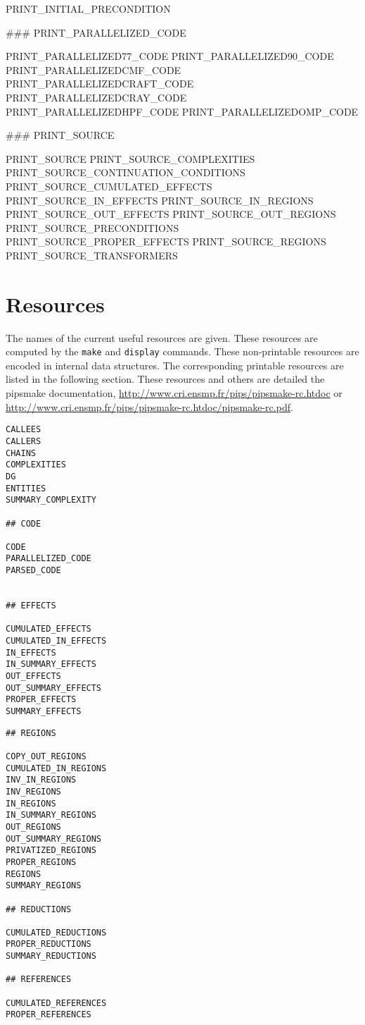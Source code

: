 \documentclass[a4paper,12pt]{article}
\newcommand{\PipsPIPSmakePDF}{\url{http://www.cri.ensmp.fr/pips/pipsmake-rc.htdoc/pipsmake-rc.pdf}\xspace}
\newcommand{\PipsPIPSmakeHTDOC}{\url{http://www.cri.ensmp.fr/pips/pipsmake-rc.htdoc}\xspace}
\begin{document}
\begin{verbatim*}
PRINT_INITIAL_PRECONDITION

### PRINT_PARALLELIZED_CODE

PRINT_PARALLELIZED77_CODE
PRINT_PARALLELIZED90_CODE
PRINT_PARALLELIZEDCMF_CODE
PRINT_PARALLELIZEDCRAFT_CODE
PRINT_PARALLELIZEDCRAY_CODE
PRINT_PARALLELIZEDHPF_CODE
PRINT_PARALLELIZEDOMP_CODE

### PRINT_SOURCE

PRINT_SOURCE
PRINT_SOURCE_COMPLEXITIES
PRINT_SOURCE_CONTINUATION_CONDITIONS
PRINT_SOURCE_CUMULATED_EFFECTS
PRINT_SOURCE_IN_EFFECTS
PRINT_SOURCE_IN_REGIONS
PRINT_SOURCE_OUT_EFFECTS
PRINT_SOURCE_OUT_REGIONS
PRINT_SOURCE_PRECONDITIONS
PRINT_SOURCE_PROPER_EFFECTS
PRINT_SOURCE_REGIONS
PRINT_SOURCE_TRANSFORMERS
\end{verbatim*}


\section{Resources}
\label{res}

The names of the current useful resources are given. These resources are
computed by the \verb+make+ and \verb+display+ commands. These
non-printable resources are encoded in internal data structures. The
corresponding printable resources are listed in the following section.
These resources and others are detailed the pipsmake documentation,
\PipsPIPSmakeHTDOC or \PipsPIPSmakePDF.

\begin{verbatim}
CALLEES
CALLERS
CHAINS  
COMPLEXITIES  
DG      
ENTITIES 
SUMMARY_COMPLEXITY

## CODE 

CODE  
PARALLELIZED_CODE
PARSED_CODE


## EFFECTS

CUMULATED_EFFECTS
CUMULATED_IN_EFFECTS
IN_EFFECTS
IN_SUMMARY_EFFECTS
OUT_EFFECTS
OUT_SUMMARY_EFFECTS
PROPER_EFFECTS
SUMMARY_EFFECTS
\end{verbatim}

\begin{verbatim}
## REGIONS
 
COPY_OUT_REGIONS                        
CUMULATED_IN_REGIONS                    
INV_IN_REGIONS                          
INV_REGIONS                             
IN_REGIONS
IN_SUMMARY_REGIONS
OUT_REGIONS
OUT_SUMMARY_REGIONS
PRIVATIZED_REGIONS
PROPER_REGIONS
REGIONS 
SUMMARY_REGIONS

## REDUCTIONS 

CUMULATED_REDUCTIONS                    
PROPER_REDUCTIONS
SUMMARY_REDUCTIONS

## REFERENCES

CUMULATED_REFERENCES                    
PROPER_REFERENCES
\end{verbatim}
\end{document}
